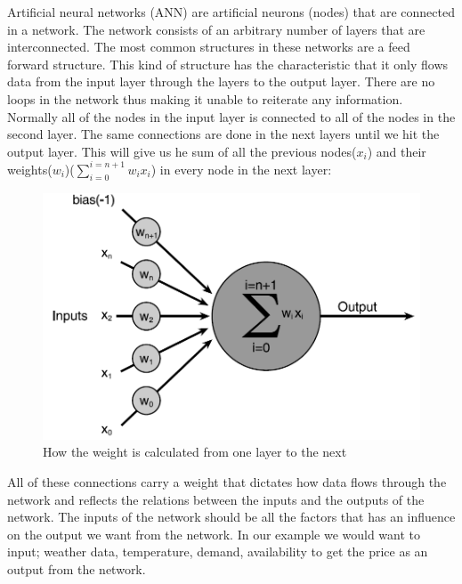 Artificial neural networks (ANN) are artificial neurons (nodes) that are connected in a network. The network consists of an arbitrary number of layers that are interconnected. The most common structures in these networks are a feed forward structure. This kind of structure has the characteristic that it only flows data from the input layer through the layers to the output layer. There are no loops in the network thus making it unable to reiterate any information. Normally all of the nodes in the input layer is connected to all of the nodes in the second layer. The same connections are done in the next layers until we hit the output layer. This will give us he sum of all the previous nodes(\begin{math}x_i\end{math}) and their weights(\begin{math}w_i\end{math})(\begin{math}\sum_{i=0}^{i=n+1} w_i x_i \end{math}) in every node in the next layer:
\begin{figure}[h!]
\centering
\includegraphics[width=0.8\linewidth,natwidth=898,natheight=587]{billeder/weight_of_layers.png}
\caption{How the weight is calculated from one layer to the next}
\label{fig:weight_of_layers}
\end{figure}
All of these connections carry a weight that dictates how data flows through the network and reflects the relations between the inputs and the outputs of the network. The inputs of the network should be all the factors that has an influence on the output we want from the network. In our example we would want to input; weather data, temperature, demand, availability \cite{21} to get the price as an output from the network.

